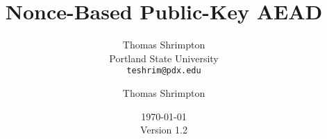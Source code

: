 \documentclass{llncs}
\begin{document}



\title{\vspace{-5mm} Nonce-Based Public-Key AEAD}


\ifnum{}
\author{
Thomas Shrimpton\\ Portland State University \\ {\tt teshrim@pdx.edu}
}

\date{\small \today  \;\; \\ Version 1.2}
\else
\author{
Thomas Shrimpton
}

\fi




\maketitle

\begin{abstract} 
\end{abstract}











\ifnum{}
\appendix
\fi
\end{document}
